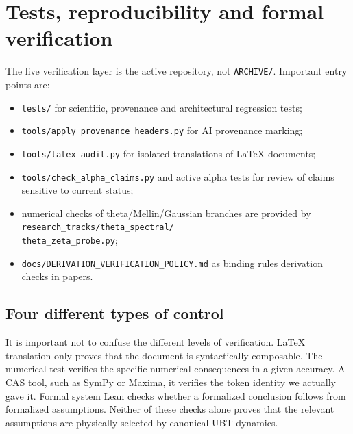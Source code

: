 
\chapter{Tests, reproducibility and formal verification}
\label{ch:tests-repro}

The live verification layer is the active repository, not \texttt{ARCHIVE/}.
Important entry points are:
\begin{itemize}
 \item \texttt{tests/} for scientific, provenance and architectural regression tests;
 \item \texttt{tools/apply\_provenance\_headers.py} for AI provenance marking;
 \item \texttt{tools/latex\_audit.py} for isolated translations of LaTeX documents;
 \item \texttt{tools/check\_alpha\_claims.py} and active alpha tests for
       review of claims sensitive to current status;
 \item numerical checks of theta/Mellin/Gaussian branches are provided by\\
       \texttt{research\_tracks/theta\_spectral/}\\
       \texttt{theta\_zeta\_probe.py};
 \item \texttt{docs/DERIVATION\_VERIFICATION\_POLICY.md} as binding rules
       derivation checks in papers.
\end{itemize}

\section{Four different types of control}
It is important not to confuse the different levels of verification. LaTeX translation only proves
that the document is syntactically composable. The numerical test verifies the specific
numerical consequences in a given accuracy. A CAS tool, such as SymPy or Maxima,
it verifies the token identity we actually gave it. Formal system
Lean checks whether a formalized conclusion follows from formalized assumptions.
Neither of these checks alone proves that the relevant assumptions are
physically selected by canonical UBT dynamics.

